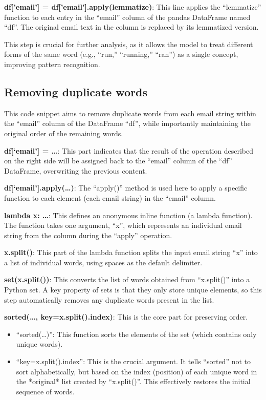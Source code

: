 \textbf{df['email'] = df['email'].apply(lemmatize)}: This line applies the ``lemmatize'' function to each entry in the ``email'' column of the pandas DataFrame named ``df''.
The original email text in the column is replaced by its lemmatized version.

This step is crucial for further analysis, as it allows the model to treat different forms of the same word (e.g., ``run,'' ``running,'' ``ran'') as a single concept, improving pattern recognition.

\subsection{Removing duplicate words}
\label{subsec:removing-duplicate-words}

This code snippet aims to remove duplicate words from each email string within the ``email'' column of the DataFrame ``df'', while importantly maintaining the original order of the remaining words.

\textbf{df[`email'] = \dots}: This part indicates that the result of the operation described on the right side will be assigned back to the ``email'' column of the ``df'' DataFrame, overwriting the previous content.

\textbf{df[`email'].apply(\dots)}: The ``apply()'' method is used here to apply a specific function to each element (each email string) in the ``email'' column.

\textbf{lambda x: \dots}: This defines an anonymous inline function (a lambda function).
The function takes one argument, ``x'', which represents an individual email string from the column during the ``apply'' operation.

\textbf{x.split()}: This part of the lambda function splits the input email string ``x'' into a list of individual words, using spaces as the default delimiter.

\textbf{set(x.split())}: This converts the list of words obtained from ``x.split()'' into a Python set.
A key property of sets is that they only store unique elements, so this step automatically removes any duplicate words present in the list.

\textbf{sorted(\dots, key=x.split().index)}: This is the core part for preserving order.
\begin{itemize}
    \item ``sorted(\ldots)'': This function sorts the elements of the set (which contains only unique words).
    \item ``key=x.split().index'': This is the crucial argument.
    It tells ``sorted'' not to sort alphabetically, but based on the index (position) of each unique word in the *original* list created by ``x.split()''.
    This effectively restores the initial sequence of words.
\end{itemize}

